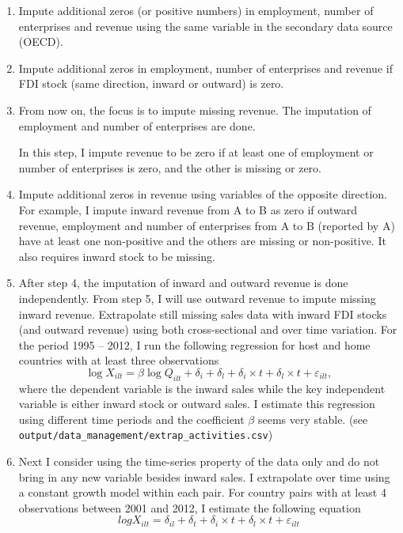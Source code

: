 \documentclass[notitlepage,11pt]{article}%
\begin{document}
\begin{enumerate}
\item Impute additional zeros (or positive numbers) in employment, number of
enterprises and revenue using the same variable in the secondary data source (OECD).

\item Impute additional zeros in employment, number of enterprises and revenue
if FDI stock (same direction, inward or outward) is zero.

\item From now on, the focus is to impute missing revenue. The imputation of
employment and number of enterprises are done.

In this step, I impute revenue to be zero if at least one of employment or
number of enterprises is zero, and the other is missing or zero.

\item Impute additional zeros in revenue using variables of the opposite
direction. For example, I impute inward revenue from A to B as zero if outward
revenue, employment and number of enterprises from A to B (reported by A) have
at least one non-positive and the others are missing or non-positive. It also
requires inward stock to be missing.

\item After step 4, the imputation of inward and outward revenue is done
independently. From step 5, I will use outward revenue to impute missing
inward revenue. Extrapolate still missing sales data with inward FDI stocks
(and outward revenue) using both cross-sectional and over time variation. For
the period 1995 -- 2012, I run the following regression for host and home
countries with at least three observations%
\[
\log X_{ilt}=\beta\log Q_{ilt}+\delta_{i}+\delta_{l}+\delta_{i}\times
t+\delta_{l}\times t+\varepsilon_{ilt},
\]
where the dependent variable is the inward sales while the key independent
variable is either inward stock or outward sales. I estimate this regression
using different time periods and the coefficient $\beta$ seems very stable.
(see \texttt{output/data\_management/extrap\_activities.csv})

\item Next I consider using the time-series property of the data only and do
not bring in any new variable besides inward sales. I extrapolate over time
using a constant growth model within each pair. For country pairs with at
least 4 observations between 2001 and 2012, I estimate the following equation%
\[
logX_{ilt}=δ _{il}+δ _{t}+δ _{i}\times t+δ _{l}\times
t+ε _{ilt}%
\]



\end{enumerate}
\end{document}
